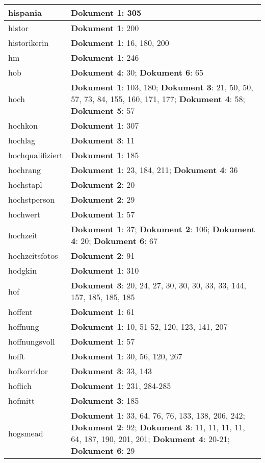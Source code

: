 \documentclass[a5paper]{article}
\begin{document}
\begin{longtable}[l]{|l|p{3in}|}
\hline
hispania & \textbf{Dokument 1}: 305 \\
\hline
histor & \textbf{Dokument 1}: 200 \\
\hline
historikerin & \textbf{Dokument 1}: 16, 180, 200 \\
\hline
hm & \textbf{Dokument 1}: 246 \\
\hline
hob & \textbf{Dokument 4}: 30; \textbf{Dokument 6}: 65 \\
\hline
hoch & \textbf{Dokument 1}: 103, 180; \textbf{Dokument 3}: 21, 50, 50, 57, 73, 84, 155, 160, 171, 177; \textbf{Dokument 4}: 58; \textbf{Dokument 5}: 57 \\
\hline
hochkon & \textbf{Dokument 1}: 307 \\
\hline
hochlag & \textbf{Dokument 3}: 11 \\
\hline
hochqualifiziert & \textbf{Dokument 1}: 185 \\
\hline
hochrang & \textbf{Dokument 1}: 23, 184, 211; \textbf{Dokument 4}: 36 \\
\hline
hochstapl & \textbf{Dokument 2}: 20 \\
\hline
hochstperson & \textbf{Dokument 2}: 29 \\
\hline
hochwert & \textbf{Dokument 1}: 57 \\
\hline
hochzeit & \textbf{Dokument 1}: 37; \textbf{Dokument 2}: 106; \textbf{Dokument 4}: 20; \textbf{Dokument 6}: 67 \\
\hline
hochzeitsfotos & \textbf{Dokument 2}: 91 \\
\hline
hodgkin & \textbf{Dokument 1}: 310 \\
\hline
hof & \textbf{Dokument 3}: 20, 24, 27, 30, 30, 30, 33, 33, 144, 157, 185, 185, 185 \\
\hline
hoffent & \textbf{Dokument 1}: 61 \\
\hline
hoffnung & \textbf{Dokument 1}: 10, 51-52, 120, 123, 141, 207 \\
\hline
hoffnungsvoll & \textbf{Dokument 1}: 57 \\
\hline
hofft & \textbf{Dokument 1}: 30, 56, 120, 267 \\
\hline
hofkorridor & \textbf{Dokument 3}: 33, 143 \\
\hline
hoflich & \textbf{Dokument 1}: 231, 284-285 \\
\hline
hofmitt & \textbf{Dokument 3}: 185 \\
\hline
hogsmead & \textbf{Dokument 1}: 33, 64, 76, 76, 133, 138, 206, 242; \textbf{Dokument 2}: 92; \textbf{Dokument 3}: 11, 11, 11, 11, 64, 187, 190, 201, 201; \textbf{Dokument 4}: 20-21; \textbf{Dokument 6}: 29 \\

\end{longtable}
\end{document}
